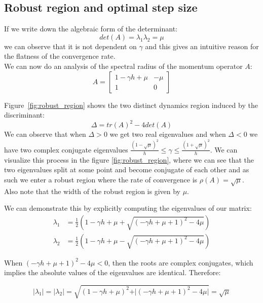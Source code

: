 \documentclass{article}
\begin{document}
\subsection{Robust region and optimal step size} %

If we write down the algebraic form of the determinant:
\begin{equation}
det(A) = \lambda_1 \lambda_2 = \mu
\end{equation}
we can observe that it is not dependent on $\gamma$ and this gives an intuitive reason for the flatness of the convergence rate.
\\

We can now do an analysis of the spectral radius of the momentum operator $A$:
\begin{equation}
A=\begin{bmatrix}1-\gamma h + \mu &-\mu \\1&0\end{bmatrix}
\end{equation}

Figure~\ref{fig:robust_region} shows the two distinct dynamics region induced by the discriminant:
\begin{equation}
\Delta = tr(A)^2 - 4 det(A)
\end{equation}
We can observe that when $\Delta > 0$ we get two real eigenvalues and when $\Delta < 0$ we have two complex conjugate eigenvalues $\frac{(1-\sqrt{\mu})^2}{h} \leq \gamma \leq \frac{(1+\sqrt{\mu})^2}{h}$. We can visualize this process in the figure \ref{fig:robust_region}, where we can see that the two eigenvalues split at some point and become conjugate of each other and as such we enter a robust region where the rate of convergence is $\rho(A) = \sqrt{\mu}$. Also note that the width of the robust region is given by $\mu$.

We can demonstrate this by explicitly computing the eigenvalues of our matrix:
\begin{align}
    \lambda_1 &= \frac{1}{2}\left(1-\gamma h + \mu + \sqrt{(-\gamma h + \mu + 1)^2 - 4 \mu} \right) \\
    \lambda_2 &= \frac{1}{2}\left(1-\gamma h + \mu - \sqrt{(-\gamma h + \mu + 1)^2 - 4 \mu} \right)
\end{align}

When $(-\gamma h + \mu + 1)^2 - 4 \mu < 0$, then the roots are complex conjugates, which implies the absolute values of the eigenvalues are identical. Therefore: 

\begin{equation}
    \vert \lambda_1 \vert = \vert \lambda_2 \vert = \sqrt{(1-\gamma h + \mu)^2 + \vert (-\gamma h + \mu + 1)^2 - 4\mu \vert } = \sqrt{\mu}
\end{equation}
\end{document}

